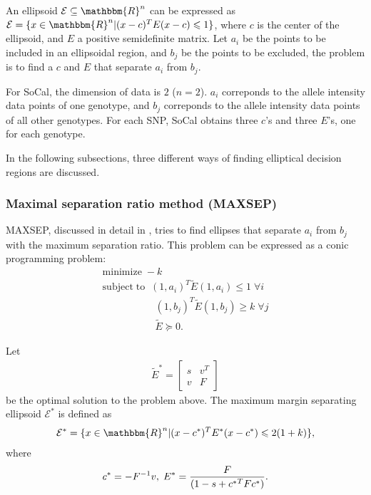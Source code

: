 \documentclass{scrartcl}
\begin{document}
\par
An ellipsoid $\mathcal{E} \subseteq \mathbbm{R}^{n}$ can be expressed as
$\mathcal{E} = \{x \in \mathbbm{R}^{n} | (x-c)^TE(x-c)\leqslant1\}$, where
$c$ is the center of the ellipsoid, and $E$ a positive semidefinite matrix.
Let $a_i$ be the points to be included in an ellipsoidal region, and $b_j$
be the points to be excluded, the problem is to find a $c$ and $E$ that
separate $a_i$ from $b_j$.

\par
For SoCal, the dimension of data is $2$ ($n=2$). $a_i$ correponds to the allele
intensity data points of one genotype, and $b_j$ correponds to the allele
intensity data points of all other genotypes. For each SNP, SoCal obtains
three $c$'s and three $E$'s, one for each genotype.

\par
In the following subsections, three different ways of finding elliptical
decision regions are discussed.

\subsubsection{Maximal separation ratio method (MAXSEP)}

\par
MAXSEP, discussed in detail in \cite{glineur1998},
tries to find ellipses that separate $a_i$ from $b_j$ with the maximum
separation ratio.
This problem can be expressed as a conic programming problem:
\begin{gather*}
\mathrm{minimize}\;-k \\
\mathrm{subject\;to}\;\;
(1,a_i)^T\tilde{E}(1,a_i)\leqslant1 \; \forall i \\
\;\;\;\;\;\;\;\;\;\;\;\;\;\;\;\;\;\;\;
(1,b_j)^T\tilde{E}(1,b_j) \ge k \; \forall j \\
\;\;\;\;\;\;\;\;\;\;\;\;\;\;\;\;\;\;\;
\tilde{E} \succeq 0.
\end{gather*}

\par
Let 
\begin{gather*}
    \tilde{E}^{*}=\left[
    \begin{array}{cc}
    s & v^T \\
    v & F
    \end{array}
    \right]
\end{gather*}
be the optimal solution to the problem above.
The maximum margin separating ellipsoid $\mathcal{E}^{*}$ is defined as
\begin{gather*}
\mathcal{E}^{*}=
\{x \in \mathbbm{R}^{n} | (x-c^{*})^TE^{*}(x-c^{*})\leqslant2(1+k)\},
\end{gather*}
where
\begin{gather*}
c^{*}=-F^{-1}v,\;E^{*}={{F} \over {(1-s+{c^{*}}^TF{c^{*}})}}.
\end{gather*}
\end{document}
